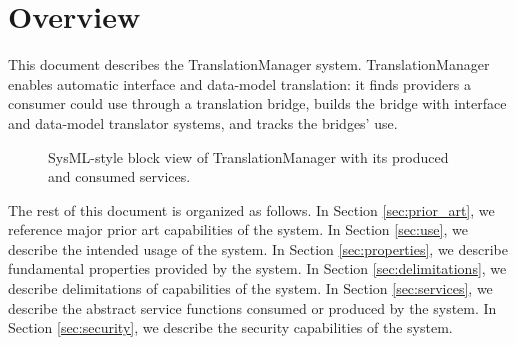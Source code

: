 \documentclass[a4paper]{arrowhead}
\begin{document}
\section{Overview}
\label{sec:overview}

This document describes the TranslationManager system. Translation\allowbreak{}Manager enables automatic interface and data-model translation: it finds providers a consumer could use through a translation bridge, builds the bridge with interface and data-model translator systems, and tracks the bridges' use.

\begin{figure}[ht!]
  \centering
  \caption{SysML-style block view of TranslationManager with its produced and consumed services.}
  \label{fig:system}
\end{figure}

The rest of this document is organized as follows.
In Section \ref{sec:prior_art}, we reference major prior art capabilities of the system.
In Section \ref{sec:use}, we describe the intended usage of the system.
In Section \ref{sec:properties}, we describe fundamental properties provided by the system.
In Section \ref{sec:delimitations}, we describe delimitations of capabilities of the system.
In Section \ref{sec:services}, we describe the abstract service functions consumed or produced by the system.
In Section \ref{sec:security}, we describe the security capabilities of the system.
\end{document}

